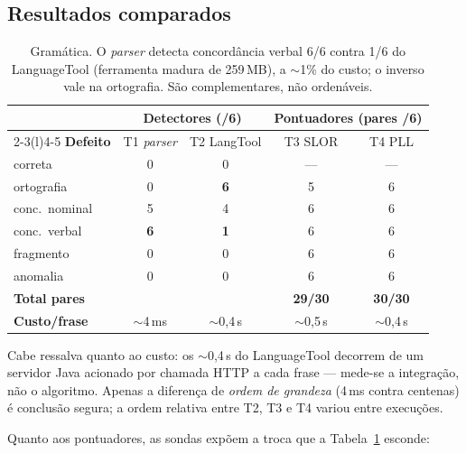 \documentclass[11pt,a4paper]{article}
\newcommand{\dimtable}[1]{\small #1}
\begin{document}
\subsection{Resultados comparados}

\begin{table}[H]
\centering
\dimtable{
\begin{tabular}{@{}lcc@{\hspace{2em}}cc@{}}
\toprule
& \multicolumn{2}{c}{\textbf{Detectores (/6)}} & \multicolumn{2}{c}{\textbf{Pontuadores (pares /6)}} \\
\cmidrule(r){2-3}\cmidrule(l){4-5}
\textbf{Defeito} & T1 \textit{parser} & T2 LangTool & T3 SLOR & T4 PLL \\
\midrule
correta        & 0 & 0 & --- & --- \\
ortografia     & 0 & \textbf{6} & 5 & 6 \\
conc.\ nominal & 5 & 4 & 6 & 6 \\
conc.\ verbal  & \textbf{6} & \textbf{1} & 6 & 6 \\
fragmento      & 0 & 0 & 6 & 6 \\
anomalia       & 0 & 0 & 6 & 6 \\
\midrule
\textbf{Total pares} & & & \textbf{29/30} & \textbf{30/30} \\
\textbf{Custo/frase}  & $\sim$4\,ms & $\sim$0{,}4\,s & $\sim$0{,}5\,s & $\sim$0{,}4\,s \\
\bottomrule
\end{tabular}}
\caption{Gramática. O \textit{parser} detecta concordância verbal 6/6 contra 1/6 do LanguageTool
(ferramenta madura de 259\,MB), a $\sim$1\% do custo; o inverso vale na ortografia. São
complementares, não ordenáveis.}
\label{tab:gramatica}
\end{table}

\noindent Cabe ressalva quanto ao custo: os $\sim$0,4\,s do LanguageTool decorrem de um servidor
Java acionado por chamada HTTP a cada frase --- mede-se a integração, não o algoritmo. Apenas a
diferença de \emph{ordem de grandeza} (4\,ms contra centenas) é conclusão segura; a ordem relativa
entre T2, T3 e T4 variou entre execuções.

Quanto aos pontuadores, as sondas expõem a troca que a Tabela~\ref{tab:gramatica} esconde:
\end{document}
